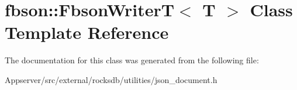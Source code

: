 \hypertarget{classfbson_1_1FbsonWriterT}{}\section{fbson\+:\+:Fbson\+WriterT$<$ T $>$ Class Template Reference}
\label{classfbson_1_1FbsonWriterT}


The documentation for this class was generated from the following file\+:\begin{DoxyCompactItemize}
\item 
Appserver/src/external/rocksdb/utilities/json\+\_\+document.\+h\end{DoxyCompactItemize}
